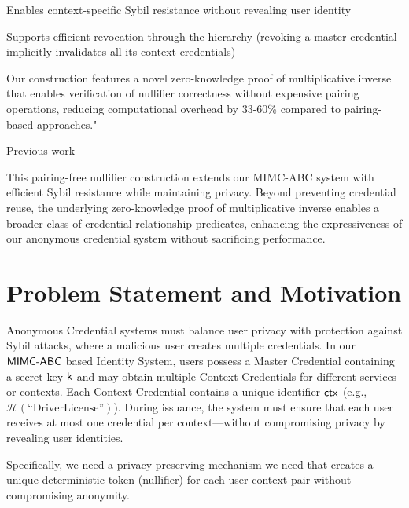 Enables context-specific Sybil resistance without revealing user identity

Supports efficient revocation through the hierarchy (revoking a master credential implicitly invalidates all its context credentials)

Our construction features a novel zero-knowledge proof of multiplicative inverse that enables verification of nullifier correctness without expensive pairing operations, reducing computational overhead by 33-60\% compared to pairing-based approaches."






Previous work


\noindent This pairing-free nullifier construction extends our MIMC-ABC system with efficient Sybil resistance while maintaining privacy. Beyond preventing credential reuse, the underlying zero-knowledge proof of multiplicative inverse enables a broader class of credential relationship predicates, enhancing the expressiveness of our anonymous credential system without sacrificing performance.

\section{Problem Statement and Motivation}
Anonymous Credential systems must balance user privacy with protection against Sybil attacks, where a malicious user creates multiple credentials. In our $\mathsf{MIMC\text{-}ABC}$ based Identity System, users possess a Master Credential containing a secret key $\mathsf{k}$ and may obtain multiple Context Credentials for different services or contexts. Each Context Credential contains a unique identifier $\mathsf{ctx}$ (e.g., $\mathcal{H}(\text{``DriverLicense''})$). During issuance, the system must ensure that each user receives at most one credential per context—without compromising privacy by revealing user identities.

Specifically, we need a privacy-preserving mechanism we need that creates a unique deterministic token (nullifier) for each user-context pair without compromising anonymity.


